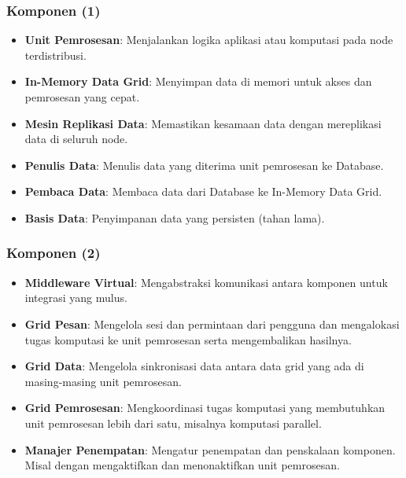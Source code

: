 \documentclass[aspectratio=169, table]{beamer}
\begin{document}
    \begin{frame}
        \frametitle{Komponen (1)}
        \begin{itemize}
            \item \textbf{Unit Pemrosesan}: Menjalankan logika aplikasi atau komputasi pada node terdistribusi.
            \item \textbf{In-Memory Data Grid}: Menyimpan data di memori untuk akses dan pemrosesan yang cepat.
            \item \textbf{Mesin Replikasi Data}: Memastikan kesamaan data dengan mereplikasi data di seluruh node.
            \item \textbf{Penulis Data}: Menulis data yang diterima unit pemrosesan ke Database.
            \item \textbf{Pembaca Data}: Membaca data dari Database ke In-Memory Data Grid.
            \item \textbf{Basis Data}: Penyimpanan data yang persisten (tahan lama).
        \end{itemize}
    \end{frame}

    \begin{frame}
        \frametitle{Komponen (2)}
        \vspace{20pt}
        \begin{itemize}
            \item \textbf{Middleware Virtual}: Mengabstraksi komunikasi antara komponen untuk integrasi yang mulus.
            \item \textbf{Grid Pesan}: Mengelola sesi dan permintaan dari pengguna dan mengalokasi tugas komputasi ke unit pemrosesan serta mengembalikan hasilnya.
            \item \textbf{Grid Data}: Mengelola sinkronisasi data antara data grid yang ada di masing-masing unit pemrosesan.
            \item \textbf{Grid Pemrosesan}: Mengkoordinasi tugas komputasi yang membutuhkan unit pemrosesan lebih dari satu, misalnya komputasi parallel.
            \item \textbf{Manajer Penempatan}: Mengatur penempatan dan penskalaan komponen. Misal dengan mengaktifkan dan menonaktifkan unit pemrosesan.
        \end{itemize}
    \end{frame}
\end{document}
